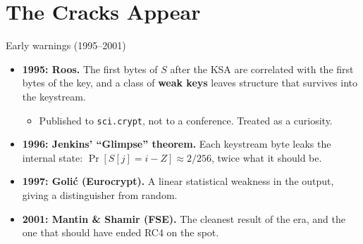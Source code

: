 \ifdefined\PRESENTATION\else\PassOptionsToClass{handout}{beamer}\fi\documentclass[aspectratio=169, lualatex]{beamer}
\begin{document}
\section{The Cracks Appear}

\begin{frame}{Early warnings (1995--2001)}
	\begin{itemize}[<+->]
		\item \textbf{1995: Roos.} The first bytes of $S$ after the KSA are correlated with the first bytes of the key, and a class of \textbf{weak keys} leaves structure that survives into the keystream.
		      \begin{itemize}
			      \item Published to \texttt{sci.crypt}, not to a conference. Treated as a curiosity.
		      \end{itemize}
		\item \textbf{1996: Jenkins' ``Glimpse'' theorem.} Each keystream byte leaks the internal state: $\Pr[S[j] = i - Z] \approx 2/256$, twice what it should be.
		\item \textbf{1997: Goli\'{c} (Eurocrypt).} A linear statistical weakness in the output, giving a distinguisher from random.
		\item \textbf{2001: Mantin \& Shamir (FSE).} The cleanest result of the era, and the one that should have ended RC4 on the spot.
	\end{itemize}
\end{frame}
\end{document}
